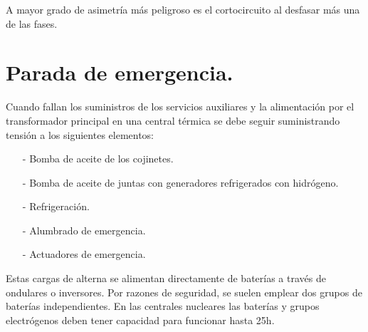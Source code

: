 A mayor grado de asimetría más peligroso es el cortocircuito al desfasar más una de las fases.
\section{Parada de emergencia.}
Cuando fallan los suministros de los servicios auxiliares y la alimentación por el transformador principal en una central térmica se debe seguir suministrando tensión a los siguientes elementos:
\begin{itemize}
	\item [-] Bomba de aceite de los cojinetes.
	\item [-] Bomba de aceite de juntas con generadores refrigerados con hidrógeno.
	\item [-] Refrigeración.
	\item [-] Alumbrado de emergencia.
	\item [-] Actuadores de emergencia.
\end{itemize}



Estas cargas de alterna se alimentan directamente de baterías a través de ondulares o inversores. Por
razones de seguridad, se suelen emplear dos grupos de baterías independientes. En las centrales nucleares las baterías y grupos electrógenos deben tener capacidad  para funcionar hasta 25h.


